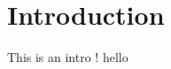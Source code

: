 \chapter{Introduction}

This is an intro \cite{lauer2007trainable}! \cite{Abdi10, adj_matrix, balci1998verification} hello